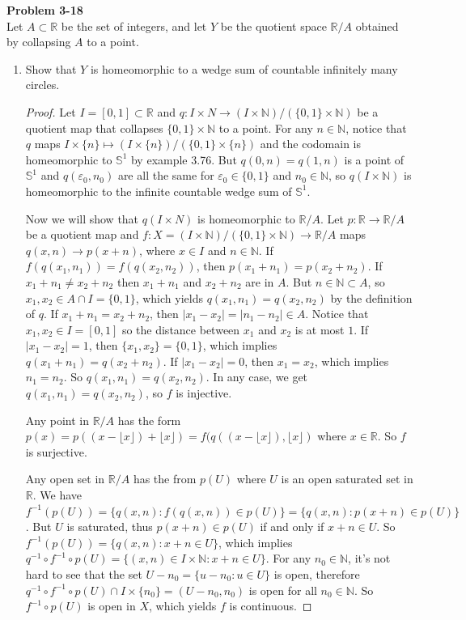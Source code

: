 \documentclass[12pt, a4paper]{article}
\theoremstyle{plain}
\newcommand{\N}{\mathbb{N}}
\newcommand{\R}{\mathbb{R}}
\def\epsilon{\varepsilon}
\newenvironment{problem}[2][Problem]
    { \begin{mdframed}[backgroundcolor=gray!20] \textbf{#1 #2} \\}
    {  \end{mdframed}}
\begin{document}
\begin{problem}{3-18}
Let $A\subset \R$ be the set of integers, and let $Y$ be the quotient space $\R/A$ obtained by collapsing $A$ to a point.
\begin{enumerate}[label=(\alph*)]
\item Show that $Y$ is homeomorphic to a wedge sum of countable infinitely many circles.
	\begin{proof}
	Let $I=[0,1]\subset \R$ and $q:I\times N\rightarrow (I\times \N)/(\{0,1\}\times \N)$ be a quotient map that collapses $\{0,1\}\times\N$ to a point. For any $n\in\N$, notice that $q$ maps $I\times\{n\}\mapsto (I\times\{n\})/(\{0,1\}\times\{n\})$ and the codomain is homeomorphic to $\mathbb{S}^1$ by example 3.76. But $q(0,n)=q(1,n)$ is a point of $\mathbb{S}^1$ and $q(\epsilon_0,n_0)$ are all the same for $\epsilon_0\in\{0,1\}$ and $n_0\in \N$, so $q(I\times \N)$ is homeomorphic to the infinite countable wedge sum of $\mathbb{S}^1$.
	
	Now we will show that $q(I\times N)$ is homeomorphic to $\R/A$. Let $p:\R\rightarrow \R/A$ be a quotient map and $f:X=(I\times\N)/(\{0,1\}\times\N)\rightarrow \R/A$ maps $q(x,n)\rightarrow p(x+n)$, where $x\in I$ and $n\in \N$. If $f(q(x_1,n_1))=f(q(x_2,n_2))$, then $p(x_1+n_1)=p(x_2+n_2)$. If $x_1+n_1\neq x_2+n_2$ then $x_1+n_1$ and $x_2+n_2$ are in $A$. But $n\in \N\subset A$, so $x_1,x_2\in A\cap I=\{0,1\}$, which yields $q(x_1,n_1)=q(x_2,n_2)$ by the definition of $q$. If $x_1+n_1=x_2+n_2$, then $|x_1-x_2|=|n_1-n_2|\in A$. Notice that $x_1,x_2\in I=[0,1]$ so the distance between $x_1$ and $x_2$ is at most $1$. If $|x_1-x_2|=1$, then $\{x_1,x_2\}=\{0,1\}$, which implies $q(x_1+n_1)=q(x_2+n_2)$. If $|x_1-x_2|=0$, then $x_1=x_2$, which implies $n_1=n_2$. So $q(x_1,n_1)=q(x_2,n_2)$. In any case, we get $q(x_1,n_1)=q(x_2,n_2)$, so $f$ is injective.
	
	Any point in $\R/A$ has the form $p(x)=p((x-\lfloor{x}\rfloor)+\lfloor{x}\rfloor)=f(q((x-\lfloor{x}\rfloor),\lfloor{x}\rfloor)$ where $x\in \R$. So $f$ is surjective.
	
	Any open set in $\R/A$ has the from $p(U)$ where $U$ is an open saturated set in $\R$. We have $f^{-1}(p(U))=\{q(x,n):f(q(x,n))\in p(U)\}=\{q(x,n):p(x+n)\in p(U)\}$. But $U$ is saturated, thus $p(x+n)\in p(U)$ if and only if $x+n\in U$. So $f^{-1}(p(U))=\{q(x,n):x+n\in U\}$, which implies $q^{-1}\circ f^{-1}\circ p(U)=\{(x,n)\in I\times\N:x+n\in U\}$. For any $n_0\in\N$, it's not hard to see that the set $U-n_0=\{u-n_0:u\in U\}$ is open, therefore $q^{-1}\circ f^{-1}\circ p(U)\cap I\times \{n_0\} = (U-n_0,n_0)$ is open for all $n_0\in \N$. So $f^{-1}\circ p(U)$ is open in $X$, which yields $f$ is continuous.
	

\end{proof}
\end{enumerate}
\end{problem}
\end{document}
